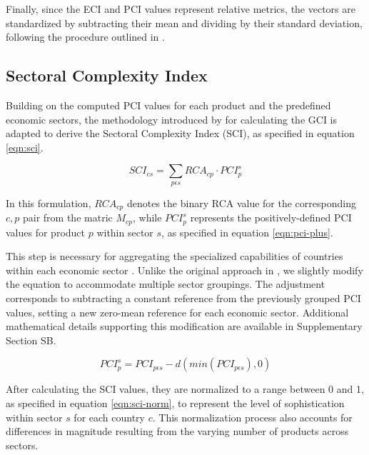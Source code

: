 \documentclass[10pt]{article}
\begin{document}
Finally, since the ECI and PCI values represent relative metrics, the vectors are standardized by subtracting their mean and dividing by their standard deviation, following the procedure outlined in \cite{hidalgoBuildingBlocksEconomic2009}.

\subsection{Sectoral Complexity Index}
\label{sec:sci}

Building on the computed PCI values for each product and the predefined economic sectors, the methodology introduced by \cite{mealyEconomicComplexityGreen2022} for calculating the GCI is adapted to derive the Sectoral Complexity Index (SCI), as specified in equation \eqref{eqn:sci}.

\begin{equation}\label{eqn:sci}
 SCI_{cs} = \sum_{p\epsilon s}RCA_{cp}\cdot PCI_{p}^{s}
\end{equation}

In this formulation, $RCA_{cp}$ denotes the binary RCA value for the corresponding $c,p$ pair from the matric $M_{cp}$, while $PCI_{p}^{s}$ represents the positively-defined PCI values for product $p$ within sector $s$, as specified in equation \eqref{eqn:pci-plus}.

This step is necessary for aggregating the specialized capabilities of countries within each economic sector \citep{mealyEconomicComplexityGreen2022}. Unlike the original approach in \cite{mealyEconomicComplexityGreen2022}, we slightly modify the equation to accommodate multiple sector groupings. The adjustment corresponds to subtracting a constant reference from the previously grouped PCI values, setting a new zero-mean reference for each economic sector. Additional mathematical details supporting this modification are available in Supplementary Section SB. %

\begin{equation}\label{eqn:pci-plus}
 PCI_{p}^{s} = PCI_{p\epsilon s} - d(min(PCI_{p\epsilon s}), 0)
\end{equation}

After calculating the SCI values, they are normalized to a range between 0 and 1, as specified in equation \eqref{eqn:sci-norm}, to represent the level of sophistication within sector $s$ for each country $c$. This normalization process also accounts for differences in magnitude resulting from the varying number of products across sectors.
\end{document}
